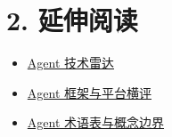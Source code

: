 \documentclass[9pt,a4paper,twocolumn]{ctexart}
\begin{document}
\section*{2. 延伸阅读}

\begin{itemize}[itemsep=1pt, topsep=2pt]
  \item \href{01-Agent技术雷达.md}{Agent 技术雷达}
  \item \href{../04-工程实践/07-Agent框架选型对比.md}{Agent 框架与平台横评}
  \item \href{../00-概念与术语/01-Agent术语表与概念边界.md}{Agent 术语表与概念边界}
\end{itemize}
\end{document}
